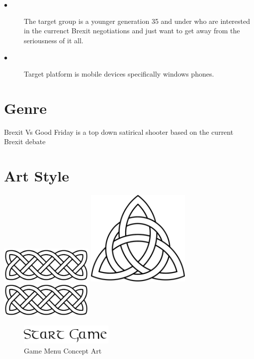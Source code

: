 \documentclass[a4paper]{scrreprt}
\begin{document}
    \begin{description}
        \item[$\bullet$] The target group is a younger generation 35 and under who are interested in the currenct Brexit negotiations and just want to get away from the seriousness of it all.
        \item[$\bullet$] Target platform is mobile devices specifically windows phones.
    \end{description}

    \section{Genre}
    Brexit Vs Good Friday is a top down satirical shooter based on the current Brexit debate

    \section{Art Style}

    \begin{center}
        \includegraphics[width=4.5cm]{celtic-knot}
        \includegraphics[width=5cm]{celtic-knot-arrow}
        \includegraphics[width=4.5cm]{celtic-knot}
        \begin{figure}[H]
            \centering
            \includegraphics[width=4.5cm]{start-game}
            \caption{\label{fig:art} Game Menu Concept Art}
        \end{figure}
    \end{center}
\end{document}
